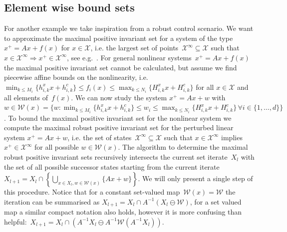 \documentclass{elsarticle}
\theoremstyle{remark}
\theoremstyle{definition}
\begin{document}
\subsection{Element wise bound sets}\label{exp:second:example}
%
For another example we take inspiration from a robust control scenario.
%
We want to approximate the maximal positive invariant set for a system of the type~$x^+=Ax + f(x)$ for $x\in\mathcal X$, i.e. the largest set of points~$\mathcal X^\infty\subseteq\mathcal X$ such that $x\in\mathcal X^\infty\Rightarrow x^+\in\mathcal X^\infty$, see e.g.~\cite{blanchini:2007}.
%
For general nonlinear systems~$x^+=Ax + f(x)$ the maximal positive invariant set cannot be calculated, but assume we find piecewise affine bounds on the nonlinearity, i.e. $\min_{k\leq M_i}\{h_{i,k}^x x + h_{i,k}^c\}\leq f_i(x)\leq\max_{k\leq N_i}\{H_{i,k}^x x + H_{i,k}^c\}$ for all $x\in\mathcal X$ and all elements of~$f(x)$.
%
We can now study the system $x^+=Ax+w$ with $w\in\mathcal W(x) = \{w:\min_{k\leq M_i}\{h_{i,k}^x x + h_{i,k}^c\}\leq w_i\leq\max_{k\leq N_i}\{H_{i,k}^x x + H_{i,k}^c\}\,\forall i\in\{1,\dots,d\}\}$.
%
To bound the maximal positive invariant set for the nonlinear system we compute the maximal robust positive invariant set for the perturbed linear system $x^+=Ax+w$, i.e. the set of states~$\mathscr X^\infty\subseteq\mathcal X$ such that $x\in\mathscr X^\infty$ implies $x^+\in\mathscr X^\infty$ for all possible $w\in\mathcal W(x)$.
%
The algorithm to determine the maximal robust positive invariant sets recursively intersects the current set iterate~$X_l$ with the set of all possible successor states starting from the current iterate $X_{l+1}=X_l\cap\left\{\bigcup_{x\in X_l,w\in\mathcal W(x)}\{Ax+w\}\right\}$.
%
We will only present a single step of this procedure.
%
Notice that for a constant set-valued map~$\mathcal W(x) = \mathcal W$ the iteration can be summarised as $X_{l+1} = X_l\cap A^{-1}(X_l\ominus\mathcal W)$, for a set valued map a similar compact notation also holds, however it is more confusing than helpful:~$X_{l+1}=X_l\cap(A^{-1}X_l\ominus A^{-1}\mathcal W(A^{-1}X_l))$.
\end{document}
